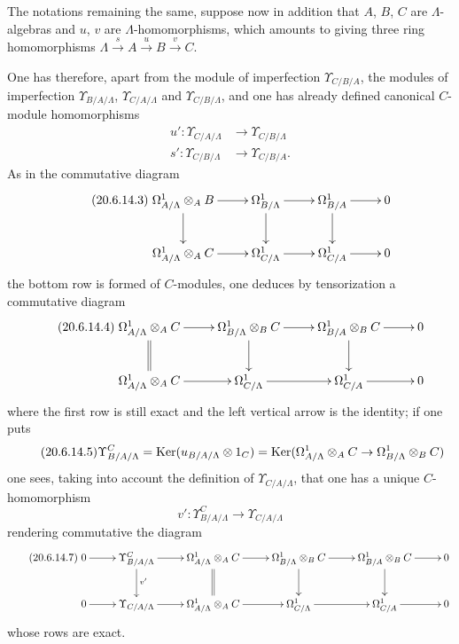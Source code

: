 \begin{env}[20.6.14]
\label{0.20.6.14}
The notations remaining the same, suppose now in addition that $A$, $B$, $C$ are $\Lambda$-algebras and $u$, $v$ are $\Lambda$-homomorphisms, which amounts to giving three ring homomorphisms $\Lambda\xrightarrow{s}A\xrightarrow{u}B\xrightarrow{v}C$.

One has therefore, apart from the module of imperfection $\Upsilon_{C/B/A}$, the modules of imperfection $\Upsilon_{B/A/\Lambda}$, $\Upsilon_{C/A/\Lambda}$ and $\Upsilon_{C/B/\Lambda}$, and one has already defined canonical $C$-module homomorphisms 
\begin{align}
\tag{20.6.14.1}
  \label{0.20.6.14.1}
  u':\Upsilon_{C/A/\Lambda}&\to\Upsilon_{C/B/\Lambda} \\
\tag{20.6.14.2}
  \label{0.20.6.14.2}
  s':\Upsilon_{C/B/\Lambda}&\to\Upsilon_{C/B/A}.
\end{align}
As in the commutative diagram 
\begin{equation}
\tag{20.6.14.3}
  \label{0.20.6.14.3}
\xymatrix{
  \Omega^1_{A/\Lambda}\otimes_A B \ar[r] \ar[d] & \Omega^1_{B/\Lambda} \ar[r] \ar[d] & \Omega^1_{B/A} \ar[r] \ar[d] & 0 \\
  \Omega^1_{A/\Lambda}\otimes_A C \ar[r] & \Omega^1_{C/\Lambda} \ar[r] & \Omega^1_{C/A} \ar[r] & 0
}
\end{equation}
the bottom row is formed of $C$-modules, one deduces by tensorization a commutative diagram
\begin{equation}
\tag{20.6.14.4}
  \label{0.20.6.14.4}
\xymatrix{
  \Omega^1_{A/\Lambda}\otimes_A C \ar[r] \ar@{=}[d] & \Omega^1_{B/\Lambda}\otimes_B C \ar[r] \ar[d] & \Omega^1_{B/A}\otimes_B C \ar[r] \ar[d] & 0 \\
  \Omega^1_{A/\Lambda}\otimes_A C \ar[r] & \Omega^1_{C/\Lambda} \ar[r] & \Omega^1_{C/A} \ar[r] & 0
}
\end{equation}
where the first row is still exact and the left vertical arrow is the identity; if one puts
\begin{equation}
\tag{20.6.14.5}
  \label{0.20.6.14.5}
  \Upsilon^C_{B/A/\Lambda}=\operatorname{Ker}(u_{B/A/\Lambda}\otimes 1_C)=\operatorname{Ker}(\Omega^1_{A/\Lambda}\otimes_A C\to\Omega^1_{B/\Lambda}\otimes_B C)
\end{equation}
one sees, taking into account the definition of $\Upsilon_{C/A/\Lambda}$, that one has a unique $C$-homomorphism
\begin{equation}
\tag{20.6.14.6}
  \label{0.20.6.14.6}
  v':\Upsilon^C_{B/A/\Lambda}\to\Upsilon_{C/A/\Lambda}
\end{equation}
rendering commutative the diagram
\begin{equation}
\tag{20.6.14.7}
  \label{0.20.6.14.7}
\xymatrix{
  0 \ar[r] & \Upsilon^C_{B/A/\Lambda} \ar[r] \ar[d]^{v'} & \Omega^1_{A/\Lambda}\otimes_A C \ar[r] \ar@{=}[d] & \Omega^1_{B/\Lambda}\otimes_B C \ar[r] \ar[d] & \Omega^1_{B/A}\otimes_B C \ar[r] \ar[d] & 0 \\
  0 \ar[r] & \Upsilon_{C/A/\Lambda} \ar[r] & \Omega^1_{A/\Lambda}\otimes_A C \ar[r] & \Omega^1_{C/\Lambda} \ar[r] & \Omega^1_{C/A} \ar[r] & 0
}
\end{equation}
whose rows are exact.


\end{env}
